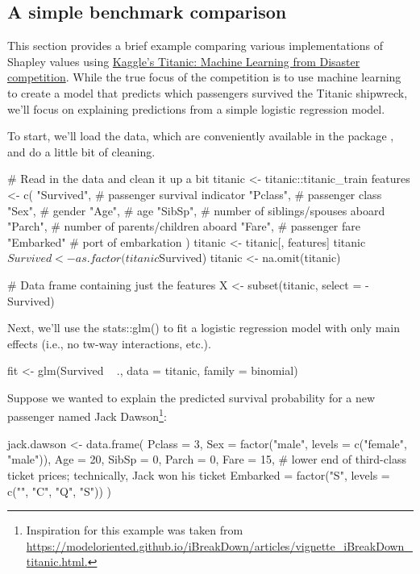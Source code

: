 \subsection{A simple benchmark comparison \label{sec:benchmark}}

This section provides a brief example comparing various implementations
of Shapley values using \href{https://www.kaggle.com/c/titanic}{Kaggle's
Titanic: Machine Learning from Disaster competition}. While the true
focus of the competition is to use machine learning to create a model
that predicts which passengers survived the Titanic shipwreck, we'll
focus on explaining predictions from a simple logistic regression model.

To start, we'll load the data, which are conveniently available in the
 package \citep{R-titanic}, and do a little bit of
cleaning.

\begin{Schunk}
\begin{Sinput}
# Read in the data and clean it up a bit
titanic <- titanic::titanic_train
features <- c(
  "Survived",  # passenger survival indicator
  "Pclass",    # passenger class
  "Sex",       # gender
  "Age",       # age
  "SibSp",     # number of siblings/spouses aboard
  "Parch",     # number of parents/children aboard
  "Fare",      # passenger fare
  "Embarked"   # port of embarkation
)
titanic <- titanic[, features]
titanic$Survived <- as.factor(titanic$Survived)
titanic <- na.omit(titanic)

# Data frame containing just the features
X <- subset(titanic, select = -Survived)
\end{Sinput}
\end{Schunk}

Next, we'll use the stats::glm() to fit a logistic regression model with
only main effects (i.e., no tw-way interactions, etc.).

\begin{Schunk}
\begin{Sinput}
fit <- glm(Survived ~ ., data = titanic, family = binomial)
\end{Sinput}
\end{Schunk}

Suppose we wanted to explain the predicted survival probability for a
new passenger named Jack
Dawson\footnote{Inspiration for this example was taken from \url{https://modeloriented.github.io/iBreakDown/articles/vignette_iBreakDown_titanic.html.}}:

\begin{Schunk}
\begin{Sinput}
jack.dawson <- data.frame(
  Pclass = 3,
  Sex = factor("male", levels = c("female", "male")),
  Age = 20,
  SibSp = 0,
  Parch = 0,
  Fare = 15,  # lower end of third-class ticket prices; technically, Jack won his ticket
  Embarked = factor("S", levels = c("", "C", "Q", "S"))
)
\end{Sinput}
\end{Schunk}

